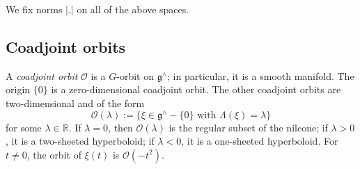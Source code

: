 \documentclass[reqno,10pt]{amsart}
\theoremstyle{plain} %
\theoremstyle{definition}
\theoremstyle{plain} %
\theoremstyle{remark}
\theoremstyle{itplain} %
\theoremstyle{remark} %
\numberwithin{equation}{section}
\begin{document}
We fix norms $|.|$ on all of the above spaces.

\subsection{Coadjoint orbits}\label{sec:coadjoint-orbits}
A \emph{coadjoint orbit} $\mathcal{O}$ is a $G$-orbit on $\mathfrak{g}^\wedge$; in particular, it is a smooth manifold.  The origin $\{0\}$ is a zero-dimensional coadjoint orbit.  The other coadjoint orbits are two-dimensional and of the form
\[
  \mathcal{O}(\lambda) := \{\text{$\xi \in\mathfrak{g}^\wedge - \{0\}$ with $\Lambda(\xi) = \lambda$}\}
\]
for some $\lambda \in \mathbb{R}$.  If $\lambda = 0$, then $\mathcal{O}(\lambda)$ is the regular subset of the nilcone; if $\lambda > 0$, it is a two-sheeted hyperboloid; if $\lambda < 0$, it is a one-sheeted hyperboloid.  For $t \neq 0$, the orbit of $\xi(t)$ is $\mathcal{O}(-t^2)$.
\end{document}
